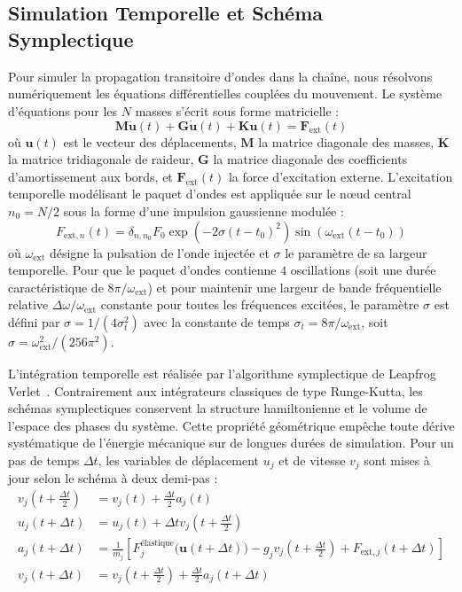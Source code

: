 \documentclass[11pt, a4paper, twoside]{article}
\begin{document}
\subsection{Simulation Temporelle et Schéma Symplectique}
Pour simuler la propagation transitoire d'ondes dans la chaîne, nous résolvons numériquement les équations différentielles couplées du mouvement. Le système d'équations pour les $N$ masses s'écrit sous forme matricielle :
\begin{equation*}
    \mathbf{M} \ddot{\mathbf{u}}(t) + \mathbf{G} \dot{\mathbf{u}}(t) + \mathbf{K} \mathbf{u}(t) = \mathbf{F}_{\text{ext}}(t)
\end{equation*}
où $\mathbf{u}(t)$ est le vecteur des déplacements, $\mathbf{M}$ la matrice diagonale des masses, $\mathbf{K}$ la matrice tridiagonale de raideur, $\mathbf{G}$ la matrice diagonale des coefficients d'amortissement aux bords, et $\mathbf{F}_{\text{ext}}(t)$ la force d'excitation externe. L'excitation temporelle modélisant le paquet d'ondes est appliquée sur le nœud central $n_0 = N/2$ sous la forme d'une impulsion gaussienne modulée :
\begin{equation}
    F_{\text{ext}, n}(t) = \delta_{n, n_0} F_0 \exp\left( -2 \sigma (t - t_0)^2 \right) \sin\left( \omega_{\text{ext}} (t - t_0) \right)
    \label{eq:f_ext_expression}
\end{equation}
où $\omega_{\text{ext}}$ désigne la pulsation de l'onde injectée et $\sigma$ le paramètre de sa largeur temporelle. Pour que le paquet d'ondes contienne $4$ oscillations (soit une durée caractéristique de $8\pi/\omega_{\text{ext}}$) et pour maintenir une largeur de bande fréquentielle relative $\Delta\omega/\omega_{\text{ext}}$ constante pour toutes les fréquences excitées, le paramètre $\sigma$ est défini par $\sigma = 1 / (4 \sigma_t^2)$ avec la constante de temps $\sigma_t = 8\pi / \omega_{\text{ext}}$, soit $\sigma = \omega_{\text{ext}}^2 / (256 \pi^2)$.

L'intégration temporelle est réalisée par l'algorithme symplectique de Leapfrog Verlet~\cite{hockney1970potential}. Contrairement aux intégrateurs classiques de type Runge-Kutta, les schémas symplectiques conservent la structure hamiltonienne et le volume de l'espace des phases du système. Cette propriété géométrique empêche toute dérive systématique de l'énergie mécanique sur de longues durées de simulation. Pour un pas de temps $\Delta t$, les variables de déplacement $u_j$ et de vitesse $v_j$ sont mises à jour selon le schéma à deux demi-pas :
\begin{align*}
    v_j\left(t + \frac{\Delta t}{2}\right) &= v_j(t) + \frac{\Delta t}{2} a_j(t) \\
    u_j(t + \Delta t) &= u_j(t) + \Delta t v_j\left(t + \frac{\Delta t}{2}\right) \\
    a_j(t + \Delta t) &= \frac{1}{m_j} \left[ F_j^{\text{élastique}}\big(\mathbf{u}(t + \Delta t)\big) - g_j v_j\left(t + \frac{\Delta t}{2}\right) + F_{\text{ext}, j}(t + \Delta t) \right] \\
    v_j(t + \Delta t) &= v_j\left(t + \frac{\Delta t}{2}\right) + \frac{\Delta t}{2} a_j(t + \Delta t)
\end{align*}
\end{document}
